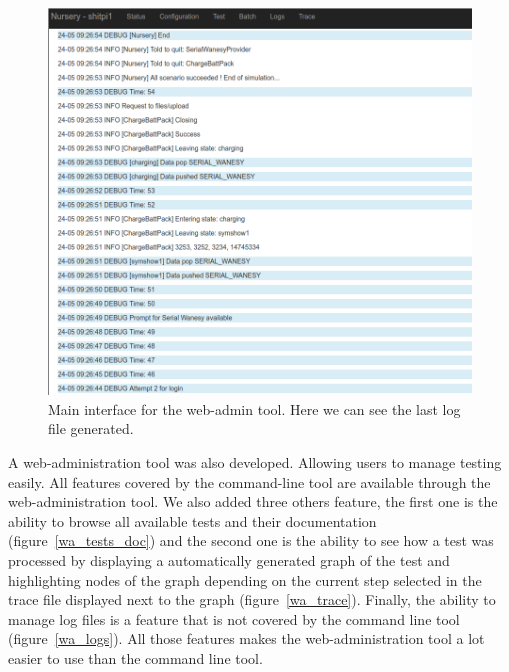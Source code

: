 \documentclass[12pt]{article}
\theoremstyle{definition}
\theoremstyle{definition}
\theoremstyle{remark}
\begin{document}
\begin{figure}
    \centering
    \includegraphics[scale=0.4]{wa_status.png}
    \caption{Main interface for the web-admin tool. Here we can see the last log file generated.}
    \label{wa_status}
\end{figure}

A web-administration tool was also developed. Allowing users to manage testing easily. All features covered by the command-line tool are available through the web-administration tool. We also added three others feature, the first one is the ability to browse all available tests and their documentation (figure~\ref{wa_tests_doc}) and the second one is the ability to see how a test was processed by displaying a automatically generated graph of the test and highlighting nodes of the graph depending on the current step selected in the trace file displayed next to the graph (figure~\ref{wa_trace}). Finally, the ability to manage log files is a feature that is not covered by the command line tool (figure~\ref{wa_logs}). All those features makes the web-administration tool a lot easier to use than the command line tool.\\
\end{document}
